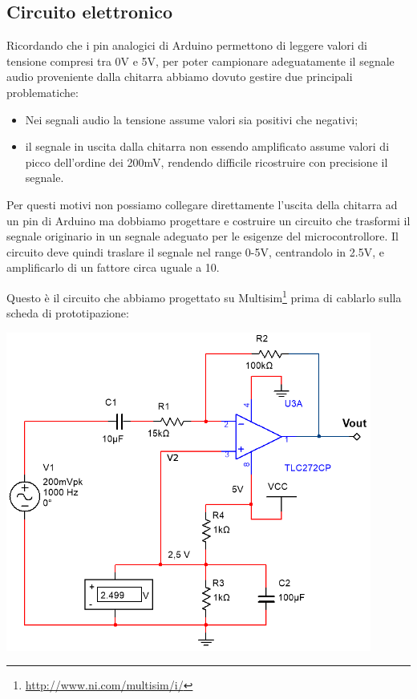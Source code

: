 \documentclass[a4paper,11pt]{article}
\begin{document}
\subsection{Circuito elettronico}
Ricordando che i pin analogici di Arduino permettono di leggere valori di tensione compresi tra 0V e 5V, per poter campionare adeguatamente il segnale audio proveniente dalla chitarra abbiamo dovuto gestire due principali problematiche:
\begin{itemize}
    \item Nei segnali audio la tensione assume valori sia positivi che negativi;
    \item il segnale in uscita dalla chitarra non essendo amplificato assume valori di picco dell'ordine dei 200mV, rendendo difficile ricostruire con precisione il segnale.
\end{itemize}

Per questi motivi non possiamo collegare direttamente l'uscita della chitarra ad un pin di Arduino ma dobbiamo progettare e costruire un circuito che trasformi il segnale originario in un segnale adeguato per le esigenze del microcontrollore.
Il circuito deve quindi traslare il segnale nel range 0-5V, centrandolo in 2.5V, e amplificarlo di un fattore circa uguale a 10.

\newpage
Questo è il circuito che abbiamo progettato su Multisim\footnote{\url{http://www.ni.com/multisim/i/}} prima di cablarlo sulla scheda di prototipazione:

\begin{center}
\includegraphics[width=0.9\textwidth]{screen.png}
\end{center}
\end{document}
